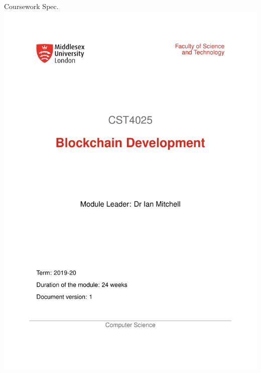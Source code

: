 \documentclass[pdf,table]{beamer}
\begin{document}
\begin{frame}{Coursework Spec.}
	\includegraphics[page=16, scale=0.250]{../../hb/4025hb.pdf}
\end{frame}
\end{document}
